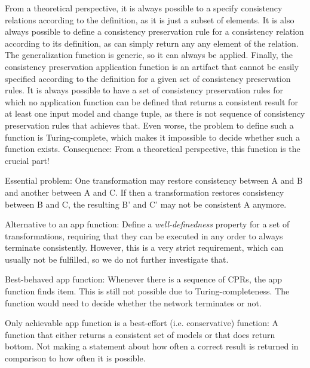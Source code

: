 From a theoretical perspective, it is always possible to a specify consistency relations according to the definition, as it is just a subset of elements.
It is also always possible to define a consistency preservation rule for a consistency relation according to its definition, as can simply return any any element of the relation.
The generalization function is generic, so it can always be applied.
Finally, the consistency preservation application function is an artifact that cannot be easily specified according to the definition for a given set of consistency preservation rules.
It is always possible to have a set of consistency preservation rules for which no application function can be defined that returns a consistent result for at least one input model and change tuple, as there is not sequence of consistency preservation rules that achieves that.
Even worse, the problem to define such a function is Turing-complete, which makes it impossible to decide whether such a function exists.
Consequence: From a theoretical perspective, this function is the crucial part!

Essential problem: One transformation may restore consistency between A and B and another between A and C. If then a transformation restores consistency between B and C, the resulting B' and C' may not be consistent A anymore.

Alternative to an app function: Define a \emph{well-definedness} property for a set of transformations, requiring that they can be executed in any order to always terminate consistently. However, this is a very strict requirement, which can usually not be fulfilled, so we do not further investigate that.


Best-behaved app function: Whenever there is a sequence of CPRs, the app function finds item. This is still not possible due to Turing-completeness. The function would need to decide whether the network terminates or not.

Only achievable app function is a best-effort (i.e. conservative) function: A function that either returns a consistent set of models or that does return bottom. Not making a statement about how often a correct result is returned in comparison to how often it is possible.

